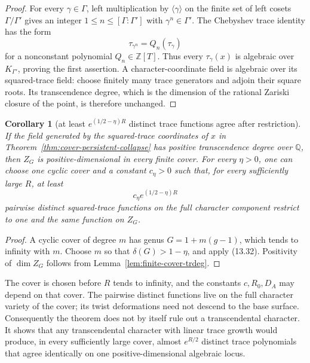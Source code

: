 \documentclass[11pt,reqno]{amsart}
\newtheorem{corollary}[theorem]{Corollary}
\theoremstyle{definition}
\theoremstyle{remark}
\newcommand{\Q}{\mathbb Q}
\newcommand{\Z}{\mathbb Z}
\begin{document}
\begin{proof}
For every \(\gamma\in\Gamma\), left multiplication by
\(\langle\gamma\rangle\) on the finite set of left cosets
\(\Gamma/\Gamma'\) gives an integer
\(1\le n\le[\Gamma:\Gamma']\) with \(\gamma^n\in\Gamma'\).  The
Chebyshev trace identity has the form
\[
 \tau_{\gamma^n}=Q_n(\tau_\gamma)
\]
for a nonconstant polynomial \(Q_n\in\Z[T]\).  Thus every
\(\tau_\gamma(x)\) is algebraic over \(K_{\Gamma'}\), proving the first
assertion.  A character-coordinate field is algebraic over its
squared-trace field: choose finitely many trace generators and adjoin their
square roots.  Its transcendence degree, which is the dimension of the
rational Zariski closure of the point, is therefore unchanged.
\end{proof}

\begin{corollary}[at least \(e^{(1/2-\eta)R}\) distinct trace functions agree after restriction]
\label{cor:cover-collapse-half}
If the field generated by the squared-trace coordinates of \(x\) in
Theorem~\ref{thm:cover-persistent-collapse} has positive transcendence
degree over \(\Q\), then \(Z_G\) is positive-dimensional in every finite
cover.
For every \(\eta>0\), one can choose one cyclic cover and a constant
\(c_\eta>0\) such that, for every sufficiently large \(R\), at least
\[
 c_\eta e^{(1/2-\eta)R}
\]
pairwise distinct squared-trace functions on the full character component
restrict to one and the same function on \(Z_G\).
\end{corollary}

\begin{proof}
A cyclic cover of degree \(m\) has genus
\(G=1+m(g-1)\), which tends to infinity with \(m\).  Choose \(m\) so that
\(\delta(G)>1-\eta\), and apply (13.32).  Positivity of
\(\dim Z_G\) follows from Lemma~\ref{lem:finite-cover-trdeg}.
\end{proof}

The cover is chosen before \(R\) tends to infinity, and the constants
\(c,R_0,D_A\) may depend on that cover.  The pairwise distinct functions
live on the full character variety of the cover; its twist deformations need
not descend to the base surface.  Consequently the theorem does not by
itself rule out a transcendental character.  It shows that any
transcendental character with linear trace growth would produce, in every
sufficiently large cover, almost \(e^{R/2}\) distinct trace polynomials that
agree identically on one positive-dimensional algebraic locus.
\end{document}
